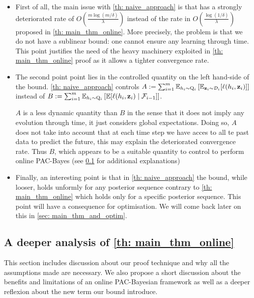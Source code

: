 \begin{itemize}
  \item First of all, the main issue with \cref{th: naive_approach} is that has a strongly deteriorated rate of $O\left(\frac{m\log(m/\delta)}{\lambda} \right)$ instead of the rate in  $O\left(\frac{\log(1/\delta)}{\lambda} \right)$ proposed in \cref{th: main_thm_online}.
  More precisely, the problem is that we do not have a sublinear bound: one cannot ensure any learning through time.
  This point justifies the need of the heavy machinery exploited in \cref{th: main_thm_online} proof as it allows a tighter convergence rate.
  \item The second point point lies in the controlled quantity on the left hand-side of the bound. \cref{th: naive_approach} controls $A:=\sum_{i=1}^m \mathbb{E}_{h_i\sim \mathrm{Q}_{i}}\left[ \mathbb{E}_{\mathbf{z}_i\sim \mathcal{D}_i}[\ell(h_i,\mathbf{z}_i)]    \right]$
  instead of $B:=\sum_{i=1}^m \mathbb{E}_{h_i\sim \mathrm{Q}_{i}}\left[ \mathbb{E}[\ell(h_i,\mathbf{z}_i) \mid \mathcal{F}_{i-1}]    \right]$.

  $A$ is a less dynamic quantity than $B$ in the sense that it does not imply any evolution through time, it just considers global expectations. Doing so, $A$ does not take into account that at each time step we have acces to all te past data to predict the future, this may explain the deteriorated convergence rate. Thus $B$, which appears to be a suitable quantity to control to perform online PAC-Bayes (see \cref{sec: deeper_analysis_main_thm} for additional explanations)

  \item Finally, an interesting point is that in \cref{th: naive_approach} the bound, while looser, holds unformly for any posterior sequence contrary to \cref{th: main_thm_online} which holds only for a specific posterior sequence. This point will have a consequence for optimisation. We will come back later on this in \cref{sec: main_thm_and_optim}.
\end{itemize}




\subsection{A deeper analysis of \cref{th: main_thm_online}}
\label{sec: deeper_analysis_main_thm}

This section includes discussion about our proof technique and why all the assumptions made are necessary. We also propose a short discussion about the benefits and limitations of an online PAC-Bayesian framework as well as a deeper reflexion about the new term our bound introduce.


